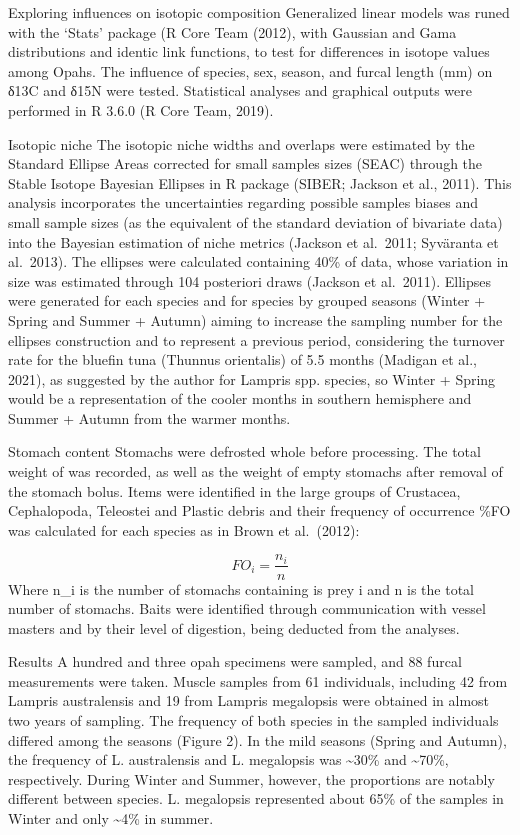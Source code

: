 \documentclass[
]{article}
\begin{document}
Exploring influences on isotopic composition Generalized linear models
was runed with the `Stats' package (R Core Team (2012), with Gaussian
and Gama distributions and identic link functions, to test for
differences in isotope values among Opahs. The influence of species,
sex, season, and furcal length (mm) on δ13C and δ15N were tested.
Statistical analyses and graphical outputs were performed in R 3.6.0 (R
Core Team, 2019).

Isotopic niche The isotopic niche widths and overlaps were estimated by
the Standard Ellipse Areas corrected for small samples sizes (SEAC)
through the Stable Isotope Bayesian Ellipses in R package (SIBER;
Jackson et al., 2011). This analysis incorporates the uncertainties
regarding possible samples biases and small sample sizes (as the
equivalent of the standard deviation of bivariate data) into the
Bayesian estimation of niche metrics (Jackson et al.~2011; Syväranta et
al.~2013). The ellipses were calculated containing 40\% of data, whose
variation in size was estimated through 104 posteriori draws (Jackson et
al.~2011). Ellipses were generated for each species and for species by
grouped seasons (Winter + Spring and Summer + Autumn) aiming to increase
the sampling number for the ellipses construction and to represent a
previous period, considering the turnover rate for the bluefin tuna
(Thunnus orientalis) of 5.5 months (Madigan et al., 2021), as suggested
by the author for Lampris spp. species, so Winter + Spring would be a
representation of the cooler months in southern hemisphere and Summer +
Autumn from the warmer months.

Stomach content Stomachs were defrosted whole before processing. The
total weight of was recorded, as well as the weight of empty stomachs
after removal of the stomach bolus. Items were identified in the large
groups of Crustacea, Cephalopoda, Teleostei and Plastic debris and their
frequency of occurrence \%FO was calculated for each species as in Brown
et al.~(2012):

\[
FO_i = \frac{n_i}{n}
\] Where n\_i is the number of stomachs containing is prey i and n is
the total number of stomachs. Baits were identified through
communication with vessel masters and by their level of digestion, being
deducted from the analyses.

Results A hundred and three opah specimens were sampled, and 88 furcal
measurements were taken. Muscle samples from 61 individuals, including
42 from Lampris australensis and 19 from Lampris megalopsis were
obtained in almost two years of sampling. The frequency of both species
in the sampled individuals differed among the seasons (Figure 2). In the
mild seasons (Spring and Autumn), the frequency of L. australensis and
L. megalopsis was \textasciitilde30\% and \textasciitilde70\%,
respectively. During Winter and Summer, however, the proportions are
notably different between species. L. megalopsis represented about 65\%
of the samples in Winter and only \textasciitilde4\% in summer.
\end{document}
